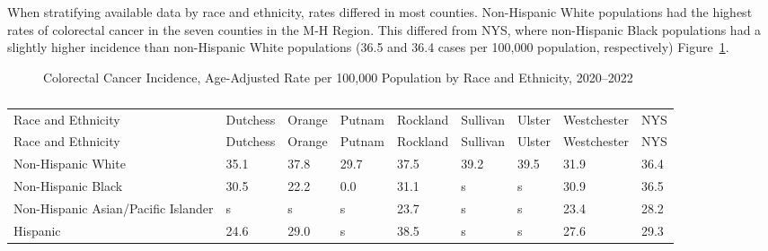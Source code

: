 \documentclass[
  english,
  letterpaper,
]{report}
\begin{document}
When stratifying available data by race and ethnicity, rates differed in
most counties. Non-Hispanic White populations had the highest rates of
colorectal cancer in the seven counties in the M-H Region. This differed
from NYS, where non-Hispanic Black populations had a slightly higher
incidence than non-Hispanic White populations (36.5 and 36.4 cases per
100,000 population, respectively)
Figure~\ref{fig-colorectalca-incidence-rande-aar}.

\begin{figure}


\caption{\label{fig-colorectalca-incidence-rande-aar}Colorectal Cancer
Incidence, Age-Adjusted Rate per 100,000 Population by Race and
Ethnicity, 2020--2022}

\end{figure}%

\begin{longtable}[]{@{}lllllllll@{}}

\caption{\label{tbl-colorectalca-incidence-rande-aar}Colorectal Cancer
Incidence, Age-Adjusted Rate per 100,000 Population by Race and
Ethnicity, 2020--2022}

\tabularnewline

\caption{}\label{T_19248}\tabularnewline
\toprule\noalign{}
Race and Ethnicity & Dutchess & Orange & Putnam & Rockland & Sullivan &
Ulster & Westchester & NYS \\
\midrule\noalign{}
\endfirsthead
\toprule\noalign{}
Race and Ethnicity & Dutchess & Orange & Putnam & Rockland & Sullivan &
Ulster & Westchester & NYS \\
\midrule\noalign{}
\endhead
\bottomrule\noalign{}
\endlastfoot
Non-Hispanic White & 35.1 & 37.8 & 29.7 & 37.5 & 39.2 & 39.5 & 31.9 &
36.4 \\
Non-Hispanic Black & 30.5 & 22.2 & 0.0 & 31.1 & s & s & 30.9 & 36.5 \\
Non-Hispanic Asian/Pacific Islander & s & s & s & 23.7 & s & s & 23.4 &
28.2 \\
Hispanic & 24.6 & 29.0 & s & 38.5 & s & s & 27.6 & 29.3 \\

\end{longtable}
\end{document}
